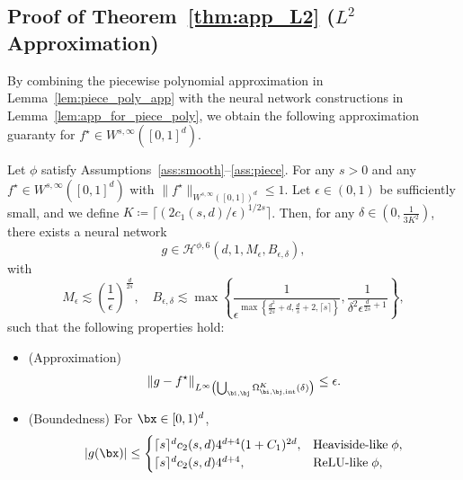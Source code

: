 \documentclass[11pt]{article}
\begin{document}
\subsection{Proof of Theorem~\ref{thm:app_L2} (\texorpdfstring{$L^{2}$}{L-2} Approximation)}
\label{subsec:app_f_star}
By combining the piecewise polynomial approximation in Lemma~\ref{lem:piece_poly_app} with the neural network constructions in Lemma~\ref{lem:app_for_piece_poly}, we obtain the following approximation guaranty for   $f^{\star} \in W^{s, \infty}([0,1]^d)$.
\begin{theorem}
    Let $\phi$ satisfy Assumptions~\ref{ass:smooth}--\ref{ass:piece}. For any $s>0$ and any $f^{\star} \in W^{s,\infty}([0,1]^d)$ with
$\|f^{\star}\|_{W^{s,\infty}([0,1])^d}\le 1$. Let $\epsilon \in(0,1)$ be sufficiently small, and we define $K \coloneqq \lceil (2 c_1(s,d) /\epsilon)^{1/2s} \rceil$. Then, for any $\delta \in (0, \frac{1}{3K^2})$, there exists a neural network
    \begin{equation*}
        g \in \mathcal{H}^{\phi,6}(d, 1, M_{\epsilon}, B_{\epsilon,\delta}),
    \end{equation*}
    with 
    \begin{equation}
         M_\epsilon \lesssim \left( \frac{1}{\epsilon}\right)^{\frac{d}{2s}},
         \quad  B_{\epsilon, \delta} \lesssim \max \left\{ \frac{1}{\epsilon^{\max \left\{ \frac{d^2}{2s}+d, \frac{d}{s}+2, \lceil s\rceil \right\} }} ,\frac{1}{\delta^2 \epsilon^{\frac{d}{2s}+1}}\right\},
        \label{eq:norm_width_app_infinity_local}
    \end{equation}
    such that the following properties hold:
    \begin{itemize}
        \item (Approximation) \[
        \|g - f^{\star}\|_{L^\infty\left(\bigcup_{\bi,\bj} \Omega^K_{\bi, \bj, \mathrm{int}}(\delta)\right)} \le \epsilon.
        \]
        \item (Boundedness) For $\bx \in [0,1)^d$,
        \begin{equation}
            |g(\bx)| \le \begin{cases}
                \lceil s\rceil^d c_2(s,d) 4^{d+4}(1+C_1)^{2d}, &   \textrm{Heaviside-like} \; \phi ,\\
                \lceil s\rceil^d c_2(s,d) 4^{d+4}, &  \textrm{ReLU-like} \; \phi,
            \end{cases}  
            \label{eq:upper_bound_app_local_infty}
        \end{equation}
    \end{itemize}
\label{thm:app_infinite_local}
\end{theorem}
\end{document}
